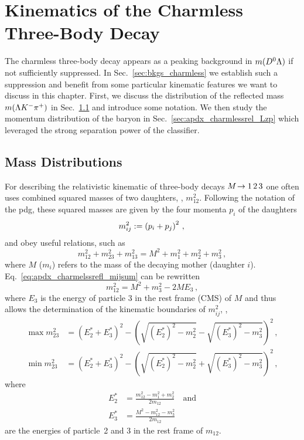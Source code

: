 \chapter{Kinematics of the Charmless Three-Body Decay \texorpdfstring{\decay{\Lb}{\Lz\Kp\Km}}{Λb → ΛKK}}
The charmless three-body decay \decay{\Lb}{\Lz\Kp\Km} appears as a peaking background in $m({{D}^0}{\Lambda})$ if not sufficiently suppressed.
In Sec.~\ref{sec:bkgs_charmless} we establish such a suppression and benefit from some particular kinematic features we want to discuss in this chapter.
First, we discuss the distribution of the reflected mass $m({\Lambda}{{K}^-}{{\pi}^+})$ in Sec.~\ref{sec:apdx_charmlessrefl_mass} and introduce some notation.
We then study the momentum distribution of the \Lz baryon in Sec.~\ref{sec:apdx_charmlessrel_Lzp} which leveraged the strong separation power of the \Lz classifier.

\section{Mass Distributions}
\label{sec:apdx_charmlessrefl_mass}
For describing the relativistic kinematic of three-body decays $M\!\rightarrow 1\,2\,3$ one often uses combined squared masses of two daughters, \eg{}, $m_{12}^2$.
Following the notation of the \gls{pdg}, these squared masses are given by the four momenta $p_i$ of the daughters
\begin{equation*}
    m^2_{ij} := \left( p_i + p_j \right)^2 \,, \\
\end{equation*}
and obey useful relations, such as
\begin{equation}
    \label{eq:apdx_charmelssrefl_mijsum}
    m_{12}^2 + m_{23}^2 + m_{13}^2 = M^2 + m_1^2 + m_2^2 + m_3^2 \,,
\end{equation}
where $M$ ($m_i$) refers to the mass of the decaying mother (daughter $i$).
Eq.~\eqref{eq:apdx_charmelssrefl_mijsum} can be rewritten
\begin{equation*}
    m_{12}^2 = M^2 + m_3^2 - 2ME_3 \,,
\end{equation*}
where $E_3$ is the energy of particle 3 in the rest frame (CMS) of $M$ and thus allows the determination of the kinematic boundaries of $m_{ij}^2$, \eg{},
\begin{align*}
    \operatorname{max} m_{23}^2 &= \left( E_2^* + E_3^* \right)^2 - \left( \sqrt{ \left( E_2^* \right)^2 - m_2^2} - \sqrt{ \left( E_3^* \right)^2 - m_3^2} \right)^2 \,, \\
    \operatorname{min} m_{23}^2 &= \left( E_2^* + E_3^* \right)^2 - \left( \sqrt{ \left( E_2^* \right)^2 - m_2^2} + \sqrt{ \left( E_3^* \right)^2 - m_3^2} \right)^2 \,,
\end{align*}
where
\begin{align*}
    E_2^* &= \frac{m_{12}^2 - m_1^2 + m_2^2}{2 m_{12}} \quad \text{and} \\
    E_3^* &= \frac{M^2 - m_{12}^2 - m_3^2}{2 m_{12}}
\end{align*}
are the energies of particle~2 and 3 in the rest frame of $m_{12}$.

